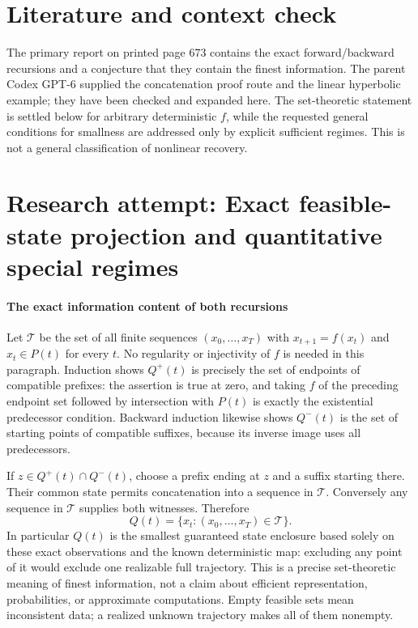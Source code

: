 \documentclass[11pt]{article}
\begin{document}
\section{Literature and context check}
The primary report on printed page 673 contains the exact forward/backward recursions and a conjecture that they contain the finest information. The parent Codex GPT-6 supplied the concatenation proof route and the linear hyperbolic example; they have been checked and expanded here. The set-theoretic statement is settled below for arbitrary deterministic $f$, while the requested general conditions for smallness are addressed only by explicit sufficient regimes. This is not a general classification of nonlinear recovery.
\section{Research attempt: Exact feasible-state projection and quantitative special regimes}

\paragraph{The exact information content of both recursions}
Let $\mathcal T$ be the set of all finite sequences $(x_0,\ldots,x_T)$ with $x_{t+1}=f(x_t)$ and $x_t\in P(t)$ for every $t$. No regularity or injectivity of $f$ is needed in this paragraph. Induction shows $Q^+(t)$ is precisely the set of endpoints of compatible prefixes: the assertion is true at zero, and taking $f$ of the preceding endpoint set followed by intersection with $P(t)$ is exactly the existential predecessor condition. Backward induction likewise shows $Q^-(t)$ is the set of starting points of compatible suffixes, because its inverse image uses all predecessors.

If $z\in Q^+(t)\cap Q^-(t)$, choose a prefix ending at $z$ and a suffix starting there. Their common state permits concatenation into a sequence in $\mathcal T$. Conversely any sequence in $\mathcal T$ supplies both witnesses. Therefore
\[
 Q(t)=\{x_t:(x_0,\ldots,x_T)\in\mathcal T\}.
 \tag{1}
\]
In particular $Q(t)$ is the smallest guaranteed state enclosure based solely on these exact observations and the known deterministic map: excluding any point of it would exclude one realizable full trajectory. This is a precise set-theoretic meaning of finest information, not a claim about efficient representation, probabilities, or approximate computations. Empty feasible sets mean inconsistent data; a realized unknown trajectory makes all of them nonempty.
\end{document}
